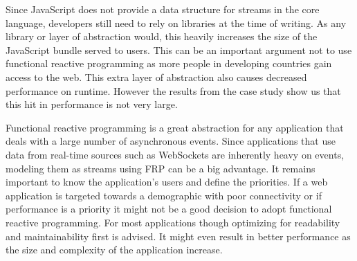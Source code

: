 Since JavaScript does not provide a data structure for streams in the core language, developers still need to rely on libraries at the time of writing. As any library or layer of abstraction would, this heavily increases the size of the JavaScript bundle served to users. This can be an important argument not to use functional reactive programming as more people in developing countries gain access to the web. This extra layer of abstraction also causes decreased performance on runtime. However the results from the case study show us that this hit in performance is not very large.

\clearpage

Functional reactive programming is a great abstraction for any application that deals with a large number of asynchronous events. Since applications that use data from real-time sources such as WebSockets are inherently heavy on events, modeling them as streams using FRP can be a big advantage. It remains important to know the application's users and define the priorities. If a web application is targeted towards a demographic with poor connectivity or if performance is a priority it might not be a good decision to adopt functional reactive programming. For most applications though optimizing for readability and maintainability first is advised. It might even result in better performance as the size and complexity of the application increase.

